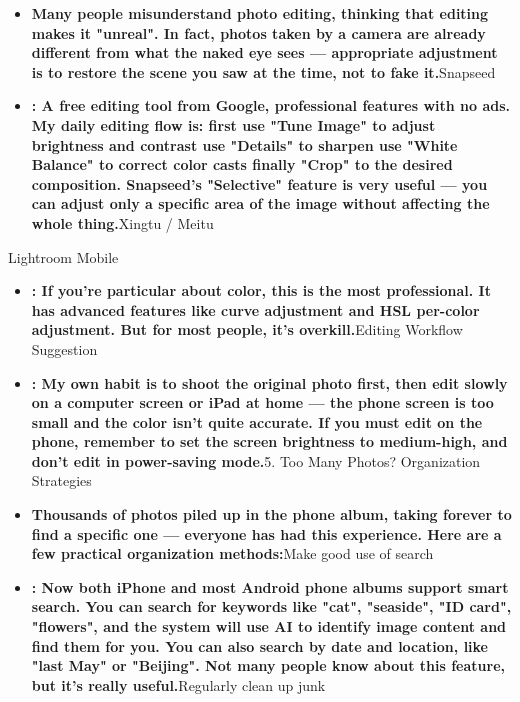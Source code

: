 \begin{itemize}
  \item \textbf{Many people misunderstand photo editing, thinking that editing makes it "unreal". In fact, photos taken by a camera are already different from what the naked eye sees — appropriate adjustment is to restore the scene you saw at the time, not to fake it.}Snapseed
  \item \textbf{: A free editing tool from Google, professional features with no ads. My daily editing flow is: first use "Tune Image" to adjust brightness and contrast use "Details" to sharpen use "White Balance" to correct color casts finally "Crop" to the desired composition. Snapseed's "Selective" feature is very useful — you can adjust only a specific area of the image without affecting the whole thing.}Xingtu / Meitu
\end{itemize}


Lightroom Mobile

\begin{itemize}
  \item \textbf{: If you're particular about color, this is the most professional. It has advanced features like curve adjustment and HSL per-color adjustment. But for most people, it's overkill.}Editing Workflow Suggestion
  \item \textbf{: My own habit is to shoot the original photo first, then edit slowly on a computer screen or iPad at home — the phone screen is too small and the color isn't quite accurate. If you must edit on the phone, remember to set the screen brightness to medium-high, and don't edit in power-saving mode.}5. Too Many Photos? Organization Strategies
  \item \textbf{Thousands of photos piled up in the phone album, taking forever to find a specific one — everyone has had this experience. Here are a few practical organization methods:}Make good use of search
  \item \textbf{: Now both iPhone and most Android phone albums support smart search. You can search for keywords like "cat", "seaside", "ID card", "flowers", and the system will use AI to identify image content and find them for you. You can also search by date and location, like "last May" or "Beijing". Not many people know about this feature, but it's really useful.}Regularly clean up junk
\end{itemize}

